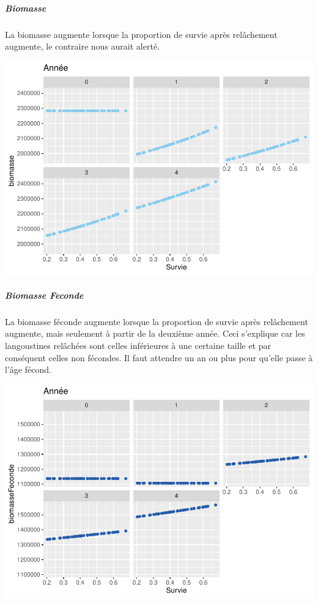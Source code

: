 \documentclass[
]{article}
\begin{document}
\hypertarget{biomasse-1}{%
\subparagraph{Biomasse}\label{biomasse-1}}

La biomasse augmente lorsque la proportion de survie après relâchement
augmente, le contraire nous aurait alerté.

\includegraphics{rapport_files/figure-latex/aocv-1.pdf}

\hypertarget{biomasse-feconde}{%
\subparagraph{Biomasse Feconde}\label{biomasse-feconde}}

La biomasse féconde augmente lorsque la proportion de survie après
relâchement augmente, mais seulement à partir de la deuxième année. Ceci
s'explique car les langoustines relâchées sont celles inférieures à une
certaine taille et par conséquent celles non fécondes. Il faut attendre
un an ou plus pour qu'elle passe à l'âge fécond.

\includegraphics{rapport_files/figure-latex/ccxc-1.pdf}
\end{document}
